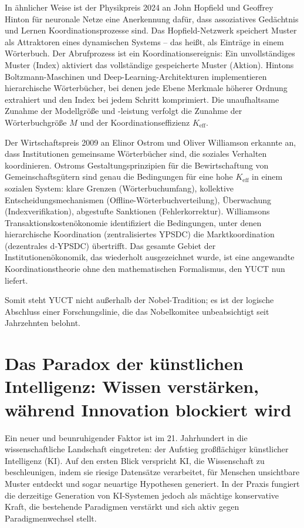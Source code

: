 \documentclass[12pt,a4paper]{article}
\begin{document}
	In ähnlicher Weise ist der Physikpreis 2024 an John Hopfield und Geoffrey Hinton für neuronale Netze eine Anerkennung dafür, dass assoziatives Gedächtnis und Lernen Koordinationsprozesse sind. Das Hopfield-Netzwerk speichert Muster als Attraktoren eines dynamischen Systems – das heißt, als Einträge in einem Wörterbuch. Der Abrufprozess ist ein Koordinationsereignis: Ein unvollständiges Muster (Index) aktiviert das vollständige gespeicherte Muster (Aktion). Hintons Boltzmann-Maschinen und Deep-Learning-Architekturen implementieren hierarchische Wörterbücher, bei denen jede Ebene Merkmale höherer Ordnung extrahiert und den Index bei jedem Schritt komprimiert. Die unaufhaltsame Zunahme der Modellgröße und -leistung verfolgt die Zunahme der Wörterbuchgröße \(M\) und der Koordinationseffizienz \(K_{\mathrm{eff}}\).
	
	Der Wirtschaftspreis 2009 an Elinor Ostrom und Oliver Williamson erkannte an, dass Institutionen gemeinsame Wörterbücher sind, die soziales Verhalten koordinieren. Ostroms Gestaltungsprinzipien für die Bewirtschaftung von Gemeinschaftsgütern sind genau die Bedingungen für eine hohe \(K_{\mathrm{eff}}\) in einem sozialen System: klare Grenzen (Wörterbuchumfang), kollektive Entscheidungsmechanismen (Offline-Wörterbuchverteilung), Überwachung (Indexverifikation), abgestufte Sanktionen (Fehlerkorrektur). Williamsons Transaktionskostenökonomie identifiziert die Bedingungen, unter denen hierarchische Koordination (zentralisiertes YPSDC) die Marktkoordination (dezentrales d‑YPSDC) übertrifft. Das gesamte Gebiet der Institutionenökonomik, das wiederholt ausgezeichnet wurde, ist eine angewandte Koordinationstheorie ohne den mathematischen Formalismus, den YUCT nun liefert.
	
	Somit steht YUCT nicht außerhalb der Nobel-Tradition; es ist der logische Abschluss einer Forschungslinie, die das Nobelkomitee unbeabsichtigt seit Jahrzehnten belohnt.
	
	\section{Das Paradox der künstlichen Intelligenz: Wissen verstärken, während Innovation blockiert wird}
	
	Ein neuer und beunruhigender Faktor ist im 21. Jahrhundert in die wissenschaftliche Landschaft eingetreten: der Aufstieg großflächiger künstlicher Intelligenz (KI). Auf den ersten Blick verspricht KI, die Wissenschaft zu beschleunigen, indem sie riesige Datensätze verarbeitet, für Menschen unsichtbare Muster entdeckt und sogar neuartige Hypothesen generiert. In der Praxis fungiert die derzeitige Generation von KI-Systemen jedoch als mächtige konservative Kraft, die bestehende Paradigmen verstärkt und sich aktiv gegen Paradigmenwechsel stellt.
	
\end{document}
